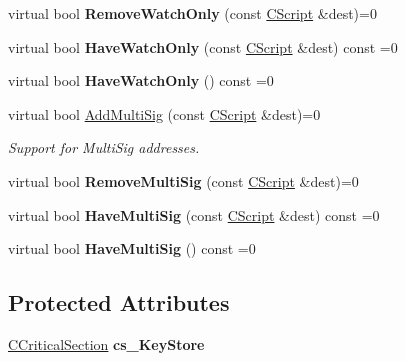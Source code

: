 \begin{DoxyCompactItemize}
\mbox{\label{class_c_key_store_ad510747f28d129123a5200e4df8f7f61}} 
virtual bool {\bfseries Remove\+Watch\+Only} (const \mbox{\hyperlink{class_c_script}{C\+Script}} \&dest)=0
\item 
\mbox{\label{class_c_key_store_a15066cfd57feaffe0b9f4103c9311109}} 
virtual bool {\bfseries Have\+Watch\+Only} (const \mbox{\hyperlink{class_c_script}{C\+Script}} \&dest) const =0
\item 
\mbox{\label{class_c_key_store_a9169351f4acf62d299afb824174cbfa8}} 
virtual bool {\bfseries Have\+Watch\+Only} () const =0
\item 
\mbox{\label{class_c_key_store_ab6af86a2277fbbe26f86d63ea38b511c}} 
virtual bool \mbox{\hyperlink{class_c_key_store_ab6af86a2277fbbe26f86d63ea38b511c}{Add\+Multi\+Sig}} (const \mbox{\hyperlink{class_c_script}{C\+Script}} \&dest)=0
\begin{DoxyCompactList}\small\item\em Support for Multi\+Sig addresses. \end{DoxyCompactList}\item 
\mbox{\label{class_c_key_store_abfdfe8c320151c251b312111058d8918}} 
virtual bool {\bfseries Remove\+Multi\+Sig} (const \mbox{\hyperlink{class_c_script}{C\+Script}} \&dest)=0
\item 
\mbox{\label{class_c_key_store_a260556f6f2aecfe317a2bfa4aed5d855}} 
virtual bool {\bfseries Have\+Multi\+Sig} (const \mbox{\hyperlink{class_c_script}{C\+Script}} \&dest) const =0
\item 
\mbox{\label{class_c_key_store_a0b1218c4094352920a7bfe84f70d1a63}} 
virtual bool {\bfseries Have\+Multi\+Sig} () const =0
\end{DoxyCompactItemize}
\subsection*{Protected Attributes}
\begin{DoxyCompactItemize}
\item 
\mbox{\label{class_c_key_store_a386524ff4a00959b81c195cb39fe307d}} 
\mbox{\hyperlink{class_annotated_mixin}{C\+Critical\+Section}} {\bfseries cs\+\_\+\+Key\+Store}
\end{DoxyCompactItemize}


